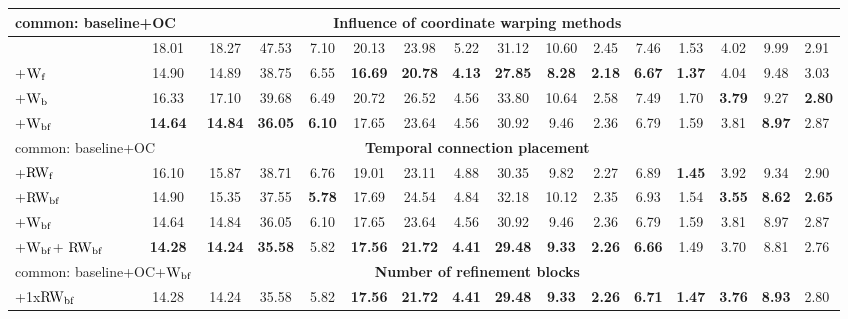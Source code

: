 \documentclass[runningheads]{llncs}
\begin{document}
\begin{table}[]
\begin{adjustbox}{max width=\textwidth}
\begin{tabular}{l|ccccc|cc|cc|ccc|ccc}
\multicolumn{2}{|l}{common: baseline+OC} & \multicolumn{12}{c}{\textbf{Influence of coordinate warping methods}} & \multicolumn{2}{l|}{} \\ \hline
\multicolumn{1}{|l|}{} & 18.01 & 18.27 & 47.53 & 7.10 & 20.13 & 23.98 & 5.22 & 31.12 & 10.60 & 2.45 & 7.46 & 1.53 & 4.02 & 9.99 & \multicolumn{1}{|l|}{2.91} \\
\multicolumn{1}{|l|}{+$\rm W_f$} & 14.90 & 14.89 & 38.75 & 6.55 & \textbf{16.69} & \textbf{20.78} & \textbf{4.13} & \textbf{27.85} & \textbf{8.28} & \textbf{2.18} & \textbf{6.67} & \textbf{1.37} & 4.04 & 9.48 & \multicolumn{1}{|l|}{3.03} \\
\multicolumn{1}{|l|}{+$\rm W_b$} & 16.33 & 17.10 & 39.68 & 6.49 & 20.72 & 26.52 & 4.56 & 33.80 & 10.64 & 2.58 & 7.49 & 1.70 & \textbf{3.79} & 9.27 & \multicolumn{1}{|l|}{\textbf{2.80}} \\
\multicolumn{1}{|l|}{+$\rm W_{bf}$} & \textbf{14.64} & \textbf{14.84} & \textbf{36.05} & \textbf{6.10} & 17.65 & 23.64 & 4.56 & 30.92 & 9.46 & 2.36 & 6.79 & 1.59 & 3.81 & \textbf{8.97} & \multicolumn{1}{|l|}{2.87} \\ \hline \hline
\multicolumn{2}{|l}{common: baseline+OC} & \multicolumn{12}{c}{\textbf{Temporal connection placement}} & \multicolumn{2}{l|}{} \\ \hline
\multicolumn{1}{|l|}{+$\rm RW_f$} & 16.10 & 15.87 & 38.71 & 6.76 & 19.01 & 23.11 & 4.88 & 30.35 & 9.82 & 2.27 & 6.89 & \textbf{1.45} & 3.92 & 9.34 & \multicolumn{1}{|l|}{2.90} \\
\multicolumn{1}{|l|}{+$\rm RW_{bf}$} & 14.90 & 15.35 & 37.55 & \textbf{5.78} & 17.69 & 24.54 & 4.84 & 32.18 & 10.12 & 2.35 & 6.93 & 1.54 & \textbf{3.55} & \textbf{8.62} & \multicolumn{1}{|l|}{\textbf{2.65}} \\
\multicolumn{1}{|l|}{+$\rm W_{bf}$} & 14.64 & 14.84 & 36.05 & 6.10 & 17.65 & 23.64 & 4.56 & 30.92 & 9.46 & 2.36 & 6.79 & 1.59 & 3.81 & 8.97 & \multicolumn{1}{|l|}{2.87} \\
\multicolumn{1}{|l|}{+$\rm W_{bf}$+ $\rm RW_{bf}$}  & \textbf{14.28} & \textbf{14.24} & \textbf{35.58} & 5.82 & \textbf{17.56} & \textbf{21.72} & \textbf{4.41} & \textbf{29.48} & \textbf{9.33} & \textbf{2.26} & \textbf{6.66} & 1.49 & 3.70 & 8.81 & \multicolumn{1}{|l|}{2.76} \\ \hline \hline
\multicolumn{2}{|l}{common: baseline+OC+$\rm W_{bf}$} & \multicolumn{12}{c}{\textbf{Number of refinement blocks}} & \multicolumn{2}{l|}{} \\ \hline
\multicolumn{1}{|l|}{+1x$\rm RW_{bf}$} & 14.28 & 14.24 & 35.58 & 5.82 & \textbf{17.56} & \textbf{21.72} & \textbf{4.41} & \textbf{29.48} & \textbf{9.33} & \textbf{2.26} & \textbf{6.71} & \textbf{1.47} & \textbf{3.76} & \textbf{8.93} & \multicolumn{1}{|l|}{2.80} \\

\end{tabular}
\end{adjustbox}
\end{table}
\end{document}

